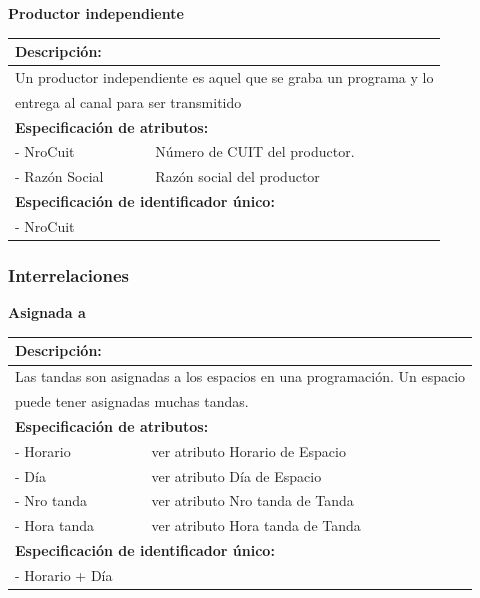 \documentclass[a4paper,10pt]{article}
\begin{document}
      \begin{flushleft}
      \begin{large} \bf{Productor independiente} \end{large}
    \end{flushleft}
      \begin{tabular}{| p{2cm} | p{9cm} |}
	\hline
	\multicolumn{2}{|l|}{\bf{Descripci\'on:}} \\
	\hline
	\multicolumn{2}{|l|}{Un productor independiente es aquel que se graba un programa y lo} \\
	\multicolumn{2}{|l|}{entrega al canal para ser transmitido} \\	
	\hline	
	\multicolumn{2}{|l|}{\bf{Especificaci\'on de atributos:}} \\
	\hline
	- NroCuit & N\'umero de CUIT del productor. \\
	\hline \hline
	- Raz\'on \newline Social & Raz\'on social del productor\\
	\hline
	\multicolumn{2}{|l|}{\bf{Especificaci\'on de identificador \'unico:}} \\
	\hline
	\multicolumn{2}{|l|}{- NroCuit} \\
	\hline
      \end{tabular} 
   
   
    \subsubsection{Interrelaciones}
    
    \begin{flushleft}
      \begin{large} \bf{Asignada a} \end{large}
    \end{flushleft}
      \begin{tabular}{| p{2cm} | p{9cm} |}
	\hline
	\multicolumn{2}{|l|}{\bf{Descripci\'on:}} \\
	\hline
	\multicolumn{2}{|l|}{Las tandas son asignadas a los espacios en una programaci\'on. Un espacio} \\
	\multicolumn{2}{|l|}{puede tener asignadas muchas tandas.} \\	
	\hline	
	\multicolumn{2}{|l|}{\bf{Especificaci\'on de atributos:}} \\
	\hline
	- Horario & ver atributo Horario de Espacio \\
	\hline \hline
	- D\'ia & ver atributo D\'ia de Espacio\\
	\hline \hline
	- Nro tanda & ver atributo Nro tanda de Tanda\\
	\hline \hline
	- Hora tanda & ver atributo Hora tanda de Tanda \\
	\hline
	\multicolumn{2}{|l|}{\bf{Especificaci\'on de identificador \'unico:}} \\
	\hline
	\multicolumn{2}{|l|}{- Horario + D\'ia } \\
	\hline
      \end{tabular}
\end{document}
